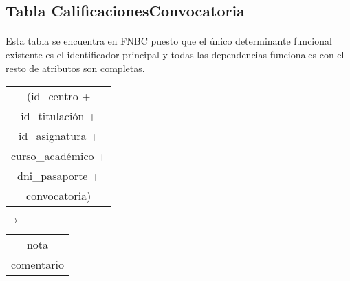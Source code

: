 \subsection{Tabla CalificacionesConvocatoria}

  \paragraph{}Esta tabla se encuentra en FNBC puesto que el único determinante
  funcional existente es el identificador principal y todas las dependencias
  funcionales con el resto de atributos son completas.

 \begin{center}
    \begin{minipage}{4.2cm}{\begin{flushright}\begin{tabular}{ | c | }
                  \hline
                  (id\_centro + \\
                  id\_titulación + \\
                  id\_asignatura + \\
                  curso\_académico + \\
                  dni\_pasaporte + \\
                  convocatoria) \\
                  \hline
                 \end{tabular}\end{flushright} }
    \end{minipage}
    \begin{minipage}{0.7cm}{$\longrightarrow$}
    \end{minipage}
    \begin{minipage}{5.9cm}{\begin{tabular}{ | c | }
                  \hline
                  nota \\
                  comentario \\
                  \hline
                 \end{tabular} }
    \end{minipage}
  \end{center}
